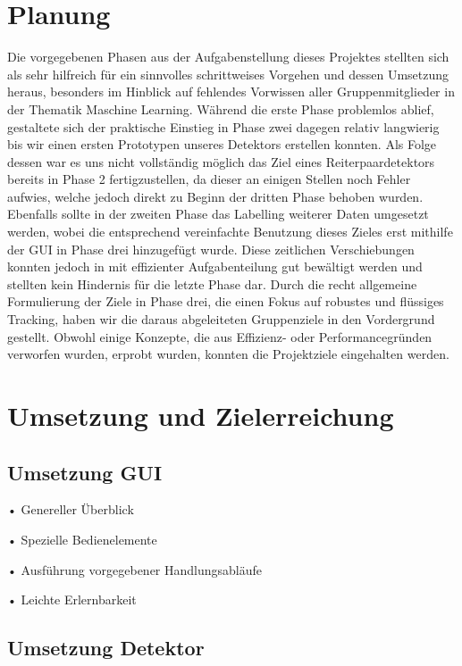 \section{Planung}
Die vorgegebenen Phasen aus der Aufgabenstellung dieses Projektes stellten sich als sehr hilfreich für ein sinnvolles schrittweises Vorgehen und dessen Umsetzung heraus, besonders im Hinblick auf fehlendes Vorwissen aller Gruppenmitglieder in der Thematik Maschine Learning. Während die erste Phase problemlos ablief, gestaltete sich der praktische Einstieg in Phase zwei dagegen relativ langwierig bis wir einen ersten Prototypen unseres Detektors erstellen konnten. Als Folge dessen war es uns nicht vollständig möglich das Ziel eines Reiterpaardetektors bereits in Phase 2 fertigzustellen, da dieser an einigen Stellen noch Fehler aufwies, welche jedoch direkt zu Beginn der dritten Phase behoben wurden. Ebenfalls sollte in der zweiten Phase das Labelling weiterer Daten umgesetzt werden, wobei die entsprechend vereinfachte Benutzung dieses Zieles erst mithilfe der GUI in Phase drei hinzugefügt wurde. Diese zeitlichen Verschiebungen konnten jedoch in mit effizienter Aufgabenteilung gut bewältigt werden und stellten kein Hindernis für die letzte Phase dar.
Durch die recht allgemeine Formulierung der Ziele in Phase drei, die einen Fokus auf robustes und flüssiges Tracking, haben wir die daraus abgeleiteten Gruppenziele in den Vordergrund gestellt. Obwohl einige Konzepte, die aus Effizienz- oder Performancegründen verworfen wurden, erprobt wurden, konnten die Projektziele eingehalten werden. 

\section{Umsetzung und Zielerreichung}

\subsection*{Umsetzung GUI}
•	Genereller Überblick

•	Spezielle Bedienelemente

•	Ausführung vorgegebener Handlungsabläufe

•	Leichte Erlernbarkeit

\subsection*{Umsetzung Detektor}

